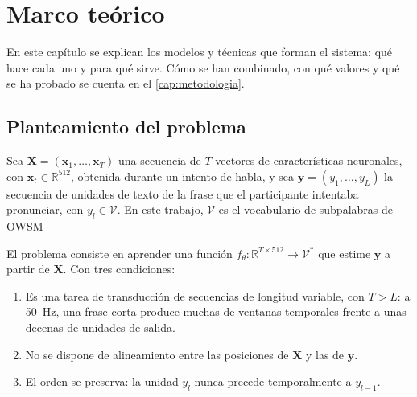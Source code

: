 
\chapter{Marco teórico}
\label{cap:marco-teorico}

En este capítulo se explican los modelos y técnicas que forman el sistema: qué hace cada uno y para qué sirve. Cómo se han combinado, con qué valores y qué se ha probado se cuenta en el \cref{cap:metodologia}.

\section{Planteamiento del problema}
\label{sec:planteamiento-formal}

Sea $\mathbf{X} = (\mathbf{x}_1, \dots, \mathbf{x}_T)$ una secuencia de $T$ vectores de características neuronales, con $\mathbf{x}_t \in \mathbb{R}^{512}$, obtenida durante un intento de habla, y sea $\mathbf{y} = (y_1, \dots, y_L)$ la secuencia de unidades de texto de la frase que el participante intentaba pronunciar, con $y_l \in \mathcal{V}$. En este trabajo, $\mathcal{V}$ es el vocabulario de subpalabras de OWSM 

El problema consiste en aprender una función $f_\theta: \mathbb{R}^{T \times 512} \rightarrow \mathcal{V}^{*}$ que estime $\mathbf{y}$ a partir de $\mathbf{X}$. Con tres condiciones:

\begin{enumerate}[label=(\alph*), leftmargin=*]
  \item Es una tarea de transducción de secuencias de longitud variable, con $T > L$: a \SI{50}{\hertz}, una frase corta produce muchas de ventanas temporales frente a unas decenas de unidades de salida.
  \item No se dispone de alineamiento entre las posiciones de $\mathbf{X}$ y las de $\mathbf{y}$.
  \item El orden se preserva: la unidad $y_l$ nunca precede temporalmente a $y_{l-1}$.
\end{enumerate}

